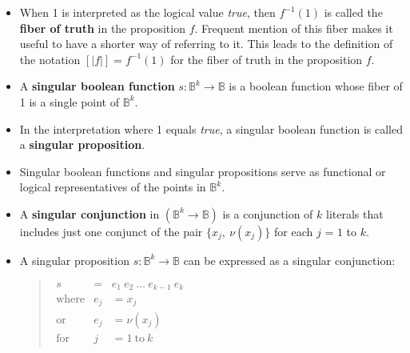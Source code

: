 \documentclass[12pt]{article}
\begin{document}
\begin{itemize}
\item
When 1 is interpreted as the logical value \textit{true}, then $f^{-1}(1)$ is called the \textbf{fiber of truth} in the proposition $f$.  Frequent mention of this fiber makes it useful to have a shorter way of referring to it.  This leads to the definition of the notation $[|f|] = f^{-1}(1)$ for the fiber of truth in the proposition $f$.

\item
A \textbf{singular boolean function} $s : \mathbb{B}^k \to \mathbb{B}$ is a boolean function whose fiber of 1 is a single point of $\mathbb{B}^k$.

\item
In the interpretation where 1 equals \textit{true}, a singular boolean function is called a \textbf{singular proposition}.

\item
Singular boolean functions and singular propositions serve as functional or logical representatives of the points in $\mathbb{B}^k$.

\item
A \textbf{singular conjunction} in $(\mathbb{B}^k \to \mathbb{B})$ is a conjunction of $k$ literals that includes just one conjunct of the pair $\{ x_j, ~ \nu(x_j) \}$ for each $j$ = $1$ to $k$.

\item
A singular proposition $s : \mathbb{B}^k \to \mathbb{B}$ can be expressed as a singular conjunction:

\begin{quote}$\begin{array}{lll}
s & = & e_1 ~ e_2 ~\ldots~ e_{k-1} ~ e_k
\\
\text{where} & e_j & = x_j
\\
\text{or}    & e_j & = \nu(x_j)
\\
\text{for}   & j   & = 1 ~\text{to}~ k
\end{array}$\end{quote}

\end{itemize}

\end{document}
